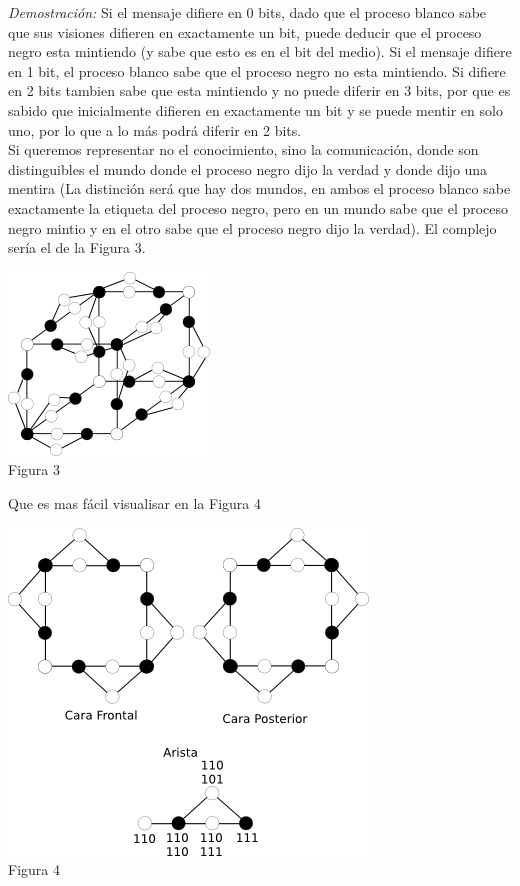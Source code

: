 \documentclass{article}
\begin{document}
\begin{enumerate}
\begin{enumerate}
\emph{Demostración:} Si el mensaje difiere en 0 bits, dado que el proceso blanco sabe que sus visiones difieren en exactamente un bit, puede deducir que el proceso negro esta mintiendo (y sabe que esto es en el bit del medio). Si el mensaje difiere en 1 bit, el proceso blanco sabe que el proceso negro no esta mintiendo.  Si difiere en 2 bits tambien sabe que esta mintiendo y no puede diferir en 3 bits, por que es sabido que inicialmente difieren en exactamente un bit y se puede mentir en solo uno, por lo que a lo más podrá diferir en 2 bits.\\

Si queremos representar no el conocimiento, sino la comunicación, donde son distinguibles el mundo donde el proceso negro dijo la verdad y donde dijo una mentira (La distinción será que hay dos mundos, en ambos el proceso blanco sabe exactamente la etiqueta del proceso negro, pero en un mundo sabe que el proceso negro mintio y en el otro sabe que el proceso negro dijo la verdad). El complejo sería el de la Figura 3.

\begin{center}
  \includegraphics{cubo3_1_1.png}\\
  Figura 3
\end{center}

Que es mas fácil visualisar en la Figura 4

\begin{center}
  \includegraphics{cubo3_2.png}\\
  Figura 4
\end{center}


\end{enumerate}
\end{enumerate}
\end{document}
